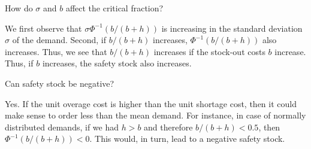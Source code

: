 \begin{exercise}
How do $\sigma$ and $b$ affect the critical fraction?
\begin{solution}
We first observe that $\sigma \Phi^{-1}(b/(b+h))$ is increasing in the standard deviation $\sigma$ of the demand.  Second, if $b/(b+h)$ increases, $\Phi^{-1}(b/(b+h))$ also increases. Thus, we see that $b/(b+h)$ increases if the stock-out costs $b$ increase. Thus, if $b$ increases, the safety stock also increases.
\end{solution}
\end{exercise}

\begin{exercise}
Can safety stock be negative?


\begin{solution}
Yes. If the unit overage cost is higher than the unit shortage cost, then it could make sense to order less than the mean demand. For instance, in case of normally distributed demands, if we had $h>b$ and therefore $b/(b+h)<0.5$, then $\Phi^{-1}(b/(b+h))<0$. This would, in turn, lead to a negative safety stock. 
\end{solution}
\end{exercise}

